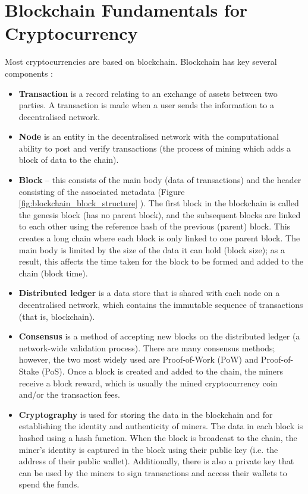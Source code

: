 \documentclass[ %
                    author={Raj Dhakan},
                supervisor={Dr. Ayush Joshi},
                    degree={MSc},
                     title={Ethereum Price Prediction using Internal and External Factors},
                  subtitle={},
                      type={},
                      year={2025}]{dissertation}
\begin{document}
\section{Blockchain Fundamentals for Cryptocurrency}
Most cryptocurrencies are based on blockchain. Blockchain has key several components \cite{RN126}:
\begin{itemize}
    \item \textbf{Transaction} is a record relating to an exchange of assets between two parties. A transaction is made when a user sends the information to a decentralised network.
    \item \textbf{Node} is an entity in the decentralised network with the computational ability to post and verify transactions (the process of mining which adds a block of data to the chain).
    \item \textbf{Block} – this consists of the main body (data of transactions) and the header consisting of the associated metadata (Figure \ref{fig:blockchain_block_structure} \cite{RN168}). The first block in the blockchain is called the genesis block (has no parent block), and the subsequent blocks are linked to each other using the reference hash of the previous (parent) block. This creates a long chain where each block is only linked to one parent block. The main body is limited by the size of the data it can hold (block size); as a result, this affects the time taken for the block to be formed and added to the chain (block time).
    \item \textbf{Distributed ledger} is a data store that is shared with each node on a decentralised network, which contains the immutable sequence of transactions (that is, blockchain).
    \item \textbf{Consensus} is a method of accepting new blocks on the distributed ledger (a network-wide validation process). There are many consensus methods; however, the two most widely used are Proof-of-Work (PoW) and Proof-of-Stake (PoS). Once a block is created and added to the chain, the miners receive a block reward, which is usually the mined cryptocurrency coin and/or the transaction fees.
    \item \textbf{Cryptography} is used for storing the data in the blockchain and for establishing the identity and authenticity of miners. The data in each block is hashed using a hash function. When the block is broadcast to the chain, the miner's identity is captured in the block using their public key (i.e. the address of their public wallet). Additionally, there is also a private key that can be used by the miners to sign transactions and access their wallets to spend the funds.
\end{itemize}
\end{document}
